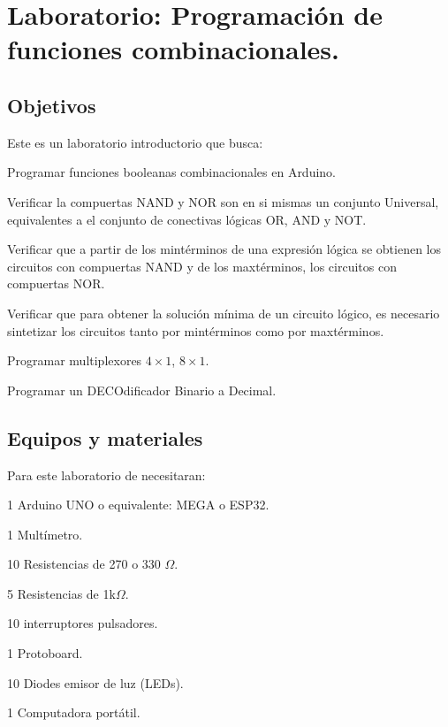 

\chapter{Laboratorio: Programación de funciones combinacionales.}

\section{Objetivos}
Este es un laboratorio introductorio que busca:
\begin{itemize}
	{\small
	 \item  Programar funciones booleanas combinacionales en Arduino.
	 \item  Verificar la compuertas NAND y NOR son en si mismas un conjunto Universal, equivalentes a el conjunto de conectivas lógicas OR, AND y NOT.
	\item  	Verificar que a partir de los mintérminos de una expresión lógica se obtienen los circuitos con compuertas NAND y de los maxtérminos, los circuitos con compuertas NOR.
	\item  Verificar que para obtener la solución mínima de un circuito lógico, es necesario sintetizar los circuitos tanto por mintérminos como por maxtérminos. 
	\item Programar multiplexores $4\times1$, $8\times1$.
	\item Programar un DECOdificador Binario a Decimal.
 }
\end{itemize} 


\section{Equipos y materiales}
Para este laboratorio de necesitaran:
\begin{itemize} 
	{\small \item 1 Arduino UNO o equivalente: MEGA o ESP32.
	\item 1 Multímetro.
	\item 10 Resistencias de 270 o 330 $\Omega$.
	\item 5 Resistencias de 1k$\Omega$.
	\item 10 interruptores pulsadores.
	\item 1 Protoboard.
	\item 10 Diodes emisor de luz (LEDs).
	\item 1 Computadora portátil.}
\end{itemize}

